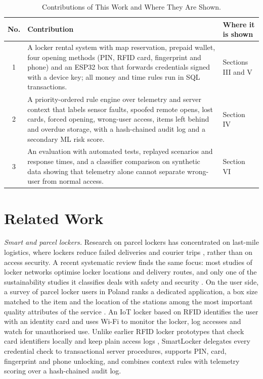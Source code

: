 \documentclass[journal,onecolumn]{IEEEtran}
\begin{document}
\begin{table}[!htbp]
\renewcommand{\arraystretch}{1.02}
\centering
\small
\caption{Contributions of This Work and Where They Are Shown.}
\label{tab:contrib}
\vspace{5pt}
\begin{tabular}{c p{11.9cm} p{2.7cm}}
\hline
No. & Contribution & Where it is shown \\
\hline
1 & A locker rental system with map reservation, prepaid wallet, four opening methods (PIN, RFID card, fingerprint and
    phone) and an ESP32 box that forwards credentials signed with a device key; all money and time rules run in SQL transactions. & Sections III and V \\
2 & A priority-ordered rule engine over telemetry and server context that labels sensor faults, spoofed remote opens,
    lost cards, forced opening, wrong-user access, items left behind and overdue storage, with a hash-chained audit log and a secondary ML risk score. & Section IV \\
3 & An evaluation with automated tests, replayed scenarios and response times, and a classifier comparison on synthetic
    data showing that telemetry alone cannot separate wrong-user from normal access. & Section VI \\
\hline
\end{tabular}
\end{table}

\section{Related Work}

\textit{Smart and parcel lockers.} Research on parcel lockers has concentrated on last-mile logistics, where lockers
reduce failed deliveries and courier trips \cite{iwan2016parcel}, rather than on access security. A recent systematic
review finds the same focus: most studies of locker networks optimise locker locations and delivery routes, and only
one of the sustainability studies it classifies deals with safety and security \cite{zhang2025parcel}. On the user
side, a survey of parcel locker users in Poland ranks a dedicated application, a box size matched to the item and the
location of the stations among the most important quality attributes of the service \cite{ciesla2023parcel}. An IoT
locker based on RFID \cite{rfidiot2023locker} identifies the user with an identity card and uses Wi-Fi to monitor the
locker, log accesses and watch for unauthorised use. Unlike earlier RFID locker prototypes that check card identifiers
locally and keep plain access logs \cite{rfidiot2023locker}, SmartLocker delegates every credential check to
transactional server procedures, supports PIN, card, fingerprint and phone unlocking, and combines context rules with
telemetry scoring over a hash-chained audit log.
\end{document}

